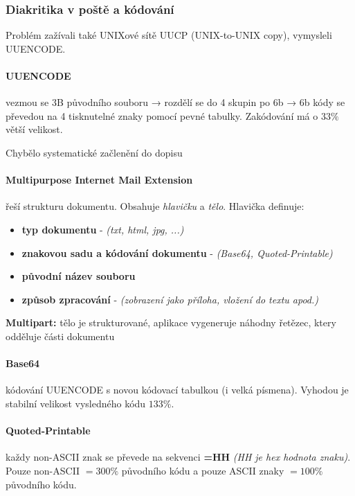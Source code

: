 \documentclass[10pt,a4paper]{article}
\begin{document}
\subsubsection{Diakritika v poště a kódování}

Problém zažívali také UNIXové sítě UUCP (UNIX-to-UNIX copy), vymysleli UUENCODE.

\paragraph{UUENCODE} vezmou se 3B původního souboru → rozdělí se do 4 skupin po 6b → 6b kódy se převedou na 4 tisknutelné znaky pomocí pevné tabulky. Zakódování má o $33\%$ větší velikost.

Chybělo systematické začlenění do dopisu

\paragraph{Multipurpose Internet Mail Extension} řeší strukturu dokumentu. Obsahuje \textit{hlavičku} a \textit{tělo}. Hlavička definuje:

\begin{itemize} 
    \item \textbf{typ dokumentu} - \textit{(txt, html, jpg, ...)}
    \item \textbf{znakovou sadu a kódování dokumentu} - \textit{(Base64, Quoted-Printable)}
    \item \textbf{původní název souboru}
    \item \textbf{způsob zpracování} - \textit{(zobrazení jako příloha, vložení do textu apod.)}
\end{itemize}

\textbf{Multipart:} tělo je strukturované, aplikace vygeneruje náhodny řetězec, ktery odděluje části dokumentu

\paragraph{Base64} kódování UUENCODE s novou kódovací tabulkou (i velká písmena). Vyhodou je stabilní velikost vysledného kódu $133\%$.
\paragraph{Quoted-Printable} každy non-ASCII znak se převede na sekvenci \textbf{=HH} \textit{(HH je hex hodnota znaku)}. Pouze non-ASCII $= 300\%$ původního kódu a pouze ASCII znaky $= 100\%$ původního kódu.
\end{document}
